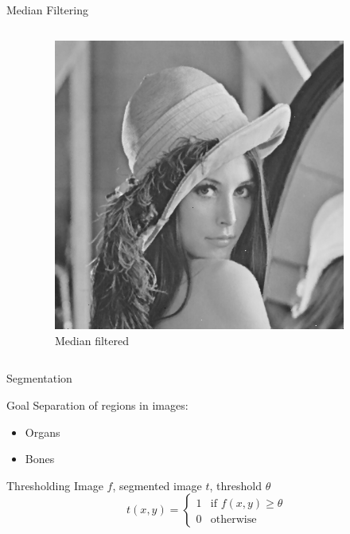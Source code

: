\begin{frame}[c]{Median Filtering}
\begin{columns}[c,onlytextwidth]
\begin{column}{0.45\textwidth}
        \end{column}
        \begin{column}{0.45\textwidth}\centering
            \begin{figure}[]
                \centering
                \includegraphics[width=0.9\textwidth]{img/lena_sp_median}
                \caption{Median filtered}%
                \label{fig:name}
            \end{figure}
        \end{column}
    \end{columns}
\end{frame}

\begin{frame}[c]{Segmentation}
    \begin{block}{Goal}
        Separation of regions in images:
        \begin{itemize}
            \item Organs
            \item Bones
        \end{itemize}
    \end{block}
    \begin{block}{Thresholding}
        Image $f$, segmented image $t$, threshold $\theta$
        \begin{equation*}
            t(x,y) =
            \begin{cases}
                1 & \mbox{if } f(x,y)\geq \theta \\
                0 & \mbox{otherwise}
            \end{cases}
        \end{equation*}
    \end{block}
\end{frame}

